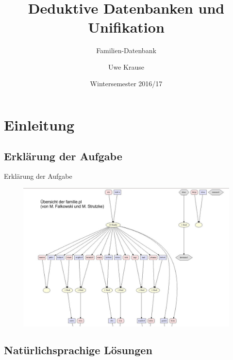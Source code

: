 \documentclass[pdf]{beamer}
\title[Referat LB Aufgabe 3]{Deduktive Datenbanken und Unifikation}
\subtitle{Familien-Datenbank}
\institute{Hochschule für Angewandte Wissenschaften Hamburg}
\author{Uwe Krause}
\date{Wintersemester 2016/17}
\begin{document}
	\begin{frame}{}
		\titlepage
	\end{frame}

	\begin{frame}{\contentsname}
			\begin{multicols}{2}
	\tableofcontents[]
			\end{multicols}
	\end{frame}



	\section{Einleitung}

	\subsection{Erklärung der Aufgabe}

	\begin{frame}[plain]{Erklärung der Aufgabe}
		\begin{figure}[!ht]
  		\includegraphics[height=\textheight]{img/stammbaum}
	\end{figure}
	\end{frame}


	\subsection{Natürlichsprachige Lösungen}
\end{document}

